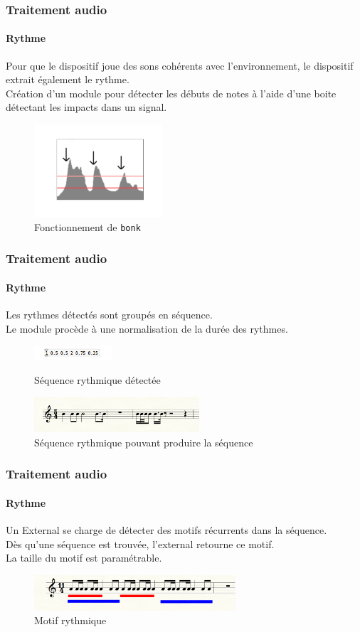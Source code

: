 \documentclass{beamer}
\begin{document}
\begin{frame}
\frametitle{Traitement audio}
\framesubtitle{Rythme}
Pour que le dispositif joue des sons cohérents avec l’environnement, le dispositif extrait également le rythme.\\
Création d'un module pour détecter les débuts de notes à l'aide d'une boite détectant les impacts dans un signal.

\begin{figure}
\centering
\includegraphics[height=130px]{bonk.jpg}
\caption{Fonctionnement de \texttt{bonk}}
\end{figure}
\end{frame}

\begin{frame}
\frametitle{Traitement audio}
\framesubtitle{Rythme}
Les rythmes détectés sont groupés en séquence.\\
Le module procède à une normalisation de la durée des rythmes.
\begin{figure}
\centering
\includegraphics[height=20px]{rythme.jpg}
\caption{Séquence rythmique détectée}
\includegraphics[height=50px]{structurerythme.jpg}
\caption{Séquence rythmique pouvant produire la séquence}
\end{figure}
\end{frame}

\begin{frame}
\frametitle{Traitement audio}
\framesubtitle{Rythme}
Un External se charge de détecter des motifs récurrents dans la séquence.\\
Dès qu'une séquence est trouvée, l'external retourne ce motif.\\
La taille du motif est paramétrable.
\begin{figure}
\centering
\includegraphics[height=50px]{motifrythme.jpg}
\caption{Motif rythmique}
\end{figure}
\end{frame}
\end{document}
